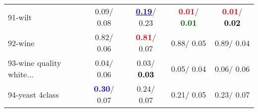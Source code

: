 \begin{table}[h]
\begin{center}
\begin{tabular}{lc|c|c|c}
91-wilt &   0.09/  0.08 & \underline{\textcolor{blue}{\textbf{  0.19}}}/  0.23 & \textcolor{red}{\textbf{  0.01}}/\textcolor{darkgreen}{\textbf{  0.01}} & \textcolor{red}{\textbf{  0.01}}/\textcolor{black}{\textbf{  0.02}} \\
92-wine &   0.82/  0.06 & \textcolor{red}{\textbf{  0.81}}/  0.07 &   0.88/  0.05 &   0.89/  0.04 \\ \hline
93-wine quality white... &   0.04/  0.06 &   0.03/\textcolor{black}{\textbf{  0.03}} &   0.05/  0.04 &   0.06/  0.06 \\
94-yeast 4class & \textcolor{blue}{\textbf{  0.30}}/  0.07 &   0.24/  0.07 &   0.21/  0.05 &   0.23/  0.07 \\\end{tabular}\label{stratsALCKappa2bVFDTRedux}
\end{center}
\end{table}